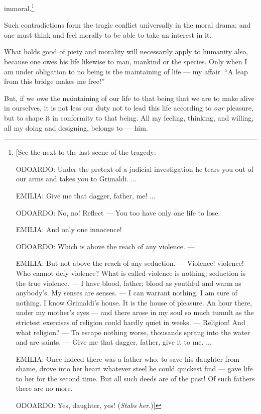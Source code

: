 immoral.\footnote{[See the next to the last scene of the tragedy:

ODOARDO: Under the pretext of a judicial investigation he tears you out of our 
arms and takes you to Grimaldi. ...

EMILIA: Give me that dagger, father, me! ...

ODOARDO: No, no! Reflect --- You too have only one life to lose.

EMILIA: And only one innocence!

ODOARDO: Which is above the reach of any violence. ---

EMILIA: But not above the reach of any seduction. --- Violence! violence! Who 
cannot defy violence? What is called violence is nothing; seduction is the 
true violence. --- I have blood, father; blood as youthful and warm as 
anybody's. My senses are senses. --- I can warrant nothing. I am sure of 
nothing. I know Grimaldi's house. It is the house of pleasure. An hour there, 
under my mother's eyes --- and there arose in my soul so much tumult as the 
strictest exercises of religion could hardly quiet in weeks. --- Religion! And 
what religion? --- To escape nothing worse, thousands sprang into the water and 
are saints. --- Give me that dagger, father, give it to me. ...

EMILIA: Once indeed there was a father who. to save his daughter from shame, 
drove into her heart whatever steel he could quickest find --- gave life to her 
for the second time. But all such deeds are of the past! Of such fathers there 
are no more.

ODOARDO: Yes, daughter, yes! (\textit{Stabs her}.)]

}

Such contradictions form the tragic conflict universally in the moral drama; 
and one must think and feel morally to be able to take an interest in it.

What holds good of piety and morality will necessarily apply to humanity also, 
because one owes his life likewise to man, mankind or the species. Only when I 
am under obligation to no being is the maintaining of life --- my affair. ``A 
leap from this bridge makes me free!''

But, if we owe the maintaining of our life to that being that we are to make 
alive in ourselves, it is not less our duty not to lead this life according to 
\textit{our} pleasure, but to shape it in conformity to that being. All my 
feeling, thinking, and willing, all my doing and designing, belongs to --- him.

